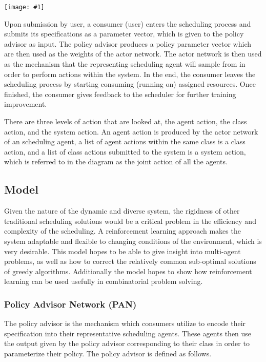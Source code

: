 \documentclass{article}
\theoremstyle{definition}
\theoremstyle{remark}
\newcommand{\addpic}[1]{\texttt{[image: \#1]}}
\begin{document}
		\addpic{figures/general_diagram.png}

		Upon submission by user, a consumer (user) enters the scheduling process and submits its specifications as a parameter vector, which is given to the policy advisor as input. The policy advisor produces a policy parameter vector which are then used as the weights of the actor network. The actor network is then used as the mechanism that the representing scheduling agent will sample from in order to perform actions within the system. In the end, the consumer leaves the scheduling process by starting consuming (running on) assigned resources. Once finished, the consumer gives feedback to the scheduler for further training improvement.

		There are three levels of action that are looked at, the agent action, the class action, and the system action. An agent action is produced by the actor network of an scheduling agent, a list of agent actions within the same class is a class action, and a list of class actions submitted to the system is a system action, which is referred to in the diagram as the joint action of all the agents.

		\subsection{Model}

		Given the nature of the dynamic and diverse system, the rigidness of other traditional scheduling solutions would be a critical problem in the efficiency and complexity of the scheduling. A reinforcement learning approach makes the system adaptable and flexible to changing conditions of the environment, which is very desirable. This model hopes to be able to give insight into multi-agent problems, as well as how to correct the relatively common sub-optimal solutions of greedy algorithms. Additionally the model hopes to show how reinforcement learning can be used usefully in combinatorial problem solving.

			\subsubsection{Policy Advisor Network (PAN)}

			The policy advisor is the mechanism which consumers utilize to encode their specification into their representative scheduling agents. These agents then use the output given by the policy advisor corresponding to their class in order to parameterize their policy. The policy advisor is defined as follows.
\end{document}
